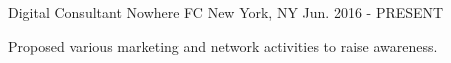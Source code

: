 

\begin{cventries}

  \cventry
    {Digital Consultant} %
    {Nowhere FC} %
    {New York, NY} %
    {Jun. 2016 - PRESENT} %
    {
      \begin{cvitems} %
        \item {}
        \item {Proposed various marketing and network activities to raise awareness.}
      \end{cvitems}
    }
    
\end{cventries}
